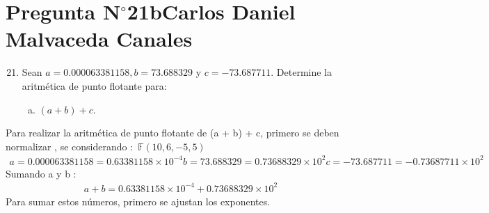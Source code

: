 \section{Pregunta N$^{\circ}$21b\qquad Carlos Daniel Malvaceda Canales}

\begin{frame}
	\begin{enumerate}\setcounter{enumi}{20}
		\item

		      Sean $a=0.000063381158, b=73.688329$ y $c=-73.687711$.
		      Determine la aritmética de punto flotante para:

		      \begin{enumerate}[b)]
			      \item

			            \begin{math}
				            \left(a+b\right)+c
			            \end{math}.
		      \end{enumerate}
	\end{enumerate}

    \begin{solution}
        Para realizar la aritmética de punto flotante de (a + b) + c, primero se deben normalizar , se considerando :\
        $\mathbb{F}\left(10,6,-5,5\right)$
        \begin{align*}
            a = 0.000063381158 = 0.63381158 \times 10^{-4}
            b = 73.688329 = 0.73688329 \times 10^{2} 
            c = -73.687711 = -0.73687711 \times 10^{2}
        \end{align*}
        Sumando a y b :
        \begin{align*}
            a + b = 0.63381158 \times 10^{-4} +  0.73688329 \times 10^{2}
        \end{align*} 
        Para sumar estos números, primero se ajustan los exponentes.
        \begin{math}
        
        \end{math}
    \end{solution}
        

\end{frame}
